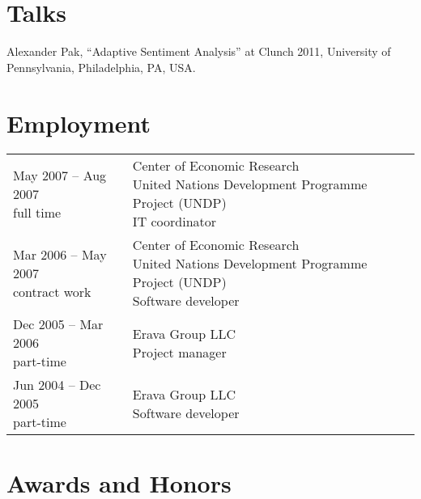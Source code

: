 \documentclass[letterpaper]{article}
\renewenvironment{itemize}{
  \begin{list}{}{
    \setlength{\leftmargin}{0.6em}
  }
}{
  \end{list}
}
\begin{document}
\section*{Talks}

\begin{itemize}

\item Alexander Pak, ``Adaptive Sentiment Analysis'' at Clunch 2011, University of
Pennsylvania, Philadelphia, PA, USA.

\end{itemize}

\section*{Employment}

\begin{table}[h]
	\begin{tabular}{ll}
	\parbox[t]{5cm}{
		May 2007 -- Aug 2007 \\
		full time
	} &
	\parbox[t]{15cm}{
		Center of Economic Research \\
    	United Nations Development Programme Project (UNDP)\\
		IT coordinator
		\vspace{1em}
    } \\
	\parbox[t]{5cm}{
		Mar 2006 -- May 2007 \\
		contract work
	} &
	\parbox[t]{15cm}{
		Center of Economic Research \\
    	United Nations Development Programme Project (UNDP)\\
		Software developer
		\vspace{1em}
    } \\
    \parbox[t]{5cm}{
		Dec 2005 -- Mar 2006\\
		part-time
	} &
	\parbox[t]{15cm}{
		Erava Group LLC\\
		Project manager
		\vspace{1em}
    } \\    
    \parbox[t]{5cm}{
		Jun 2004 -- Dec 2005\\
		part-time
	} &
	\parbox[t]{15cm}{
		Erava Group LLC\\
		Software developer
    } \\
    \end{tabular}
\end{table}

\section*{Awards and Honors}
\end{document}
